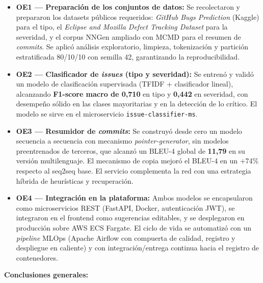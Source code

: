 \begin{itemize}\itemsep=2pt

    \item \textbf{OE1 — Preparación de los conjuntos de datos:} Se recolectaron y prepararon los datasets públicos requeridos: \textit{GitHub Bugs Prediction} (Kaggle) para el tipo, el \textit{Eclipse and Mozilla Defect Tracking Dataset} \citep{Lamkanfi2010} para la severidad, y el corpus NNGen ampliado con MCMD para el resumen de \textit{commits}. Se aplicó análisis exploratorio, limpieza, tokenización y partición estratificada 80/10/10 con semilla 42, garantizando la reproducibilidad.

    \item \textbf{OE2 — Clasificador de \textit{issues} (tipo y severidad):} Se entrenó y validó un modelo de clasificación supervisada (\acrshort{TFIDF} + clasificador lineal), alcanzando \textbf{F1-score macro de 0{,}710} en tipo y \textbf{0{,}442} en severidad, con desempeño sólido en las clases mayoritarias y en la detección de lo crítico. El modelo se sirve en el microservicio \texttt{issue-classifier-ms}.

    \item \textbf{OE3 — Resumidor de \textit{commits}:} Se construyó desde cero un modelo secuencia a secuencia con mecanismo \textit{pointer-generator}, sin modelos preentrenados de terceros, que alcanzó un \acrshort{BLEU}-4 global de \textbf{11{,}79} en su versión multilenguaje. El mecanismo de copia mejoró el \acrshort{BLEU}-4 en un +74\% respecto al seq2seq base. El servicio complementa la red con una estrategia híbrida de heurísticas y recuperación.

    \item \textbf{OE4 — Integración en la plataforma:} Ambos modelos se encapsularon como microservicios \acrshort{REST} (FastAPI, Docker, autenticación JWT), se integraron en el frontend como sugerencias editables, y se desplegaron en producción sobre AWS ECS Fargate. El ciclo de vida se automatizó con un \textit{pipeline} \acrshort{MLOps} (Apache Airflow con compuerta de calidad, registro y despliegue en caliente) y con integración/entrega continua hacia el registro de contenedores.

\end{itemize}

\vspace{0.5em}

\textbf{Conclusiones generales:}

\vspace{0.3em}

